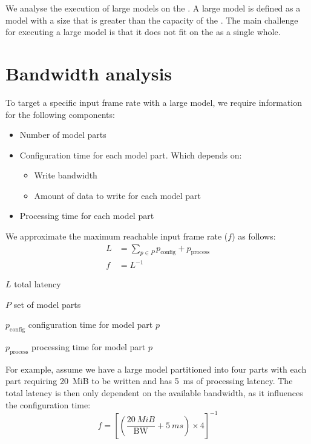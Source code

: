 We analyse the execution of large models on the \graicore{}.
A large model is defined as a model with a size that is greater than the capacity of the \graicore{}.
The main challenge for executing a large model is that it does not fit on the \graicore{} as a single whole.

\section{Bandwidth analysis}
To target a specific input frame rate with a large model, we require information for the following components:
\begin{itemize}
    \item Number of model parts
    \item Configuration time for each model part. Which depends on:
    \begin{itemize}
        \item Write bandwidth
        \item Amount of data to write for each model part
    \end{itemize}
    \item Processing time for each model part
\end{itemize}

We approximate the maximum reachable input frame rate ($f$) as follows:
\begin{align*} 
    L &= \sum_{p \in P}^{}{p_{\textrm{config}} + p_{\textrm{process}}} \\
    f &= L^{-1}
\end{align*}

\begin{eqexpl}[15mm]
    \item{$L$} total latency
    \item{$P$} set of model parts
    \item{$p_{\textrm{config}}$} configuration time for model part $p$
    \item{$p_{\textrm{process}}$} processing time for model part $p$
\end{eqexpl}

For example, assume we have a large model partitioned into four parts with each part requiring \SI{20}{MiB} to be written and has \SI{5}{ms} of processing latency.
The total latency is then only dependent on the available bandwidth, as it influences the configuration time:
\begin{equation*}
    f = \left[ \left( \frac{\SI{20}{MiB}}{\textrm{BW}} + \SI{5}{ms} \right) \times 4 \right]^{-1}
\end{equation*}


